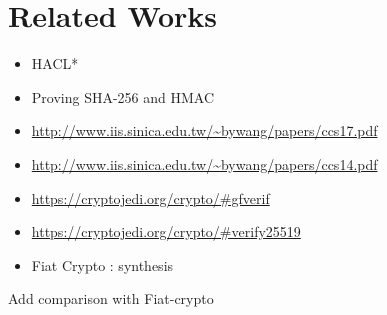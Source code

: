 \section{Related Works}

\begin{itemize}
  \item HACL*
  \item Proving SHA-256 and HMAC
  \item \url{http://www.iis.sinica.edu.tw/~bywang/papers/ccs17.pdf}
  \item \url{http://www.iis.sinica.edu.tw/~bywang/papers/ccs14.pdf}
  \item \url{https://cryptojedi.org/crypto/#gfverif}
  \item \url{https://cryptojedi.org/crypto/#verify25519}
  \item Fiat Crypto : synthesis
\end{itemize}

Add comparison with Fiat-crypto
